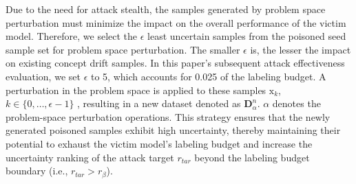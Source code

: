 \begin{table}[h!]
	\caption{Problem-Space Perturbation Operations}
	\label{tab: List of Problem Space Perturbation Operations}
	\setlength{\tabcolsep}{5.8pt}
	\begin{center}
	\end{center}
\end{table}

Due to the need for attack stealth, the samples generated by problem space perturbation must minimize the impact on the overall performance of the victim model. 
Therefore, we select the $\epsilon$ least uncertain samples from the poisoned seed sample set for problem space perturbation. 
The smaller $\epsilon$ is, the lesser the impact on existing concept drift samples.
In this paper's subsequent attack effectiveness evaluation, we set $\epsilon$ to 5, which accounts for 0.025 of the labeling budget.
A perturbation in the problem space is applied to these samples $\bm{\mathrm{x}}_{k}$, $k \in \{0, \dots,  \epsilon-1 \}$ , resulting in a new dataset denoted as $\bm{D}_{\alpha}^{n}$.
$\alpha$ denotes the problem-space perturbation operations.
This strategy ensures that the newly generated poisoned samples exhibit high uncertainty, thereby maintaining their potential to exhaust the victim model’s labeling budget and increase the uncertainty ranking of the attack target $r_{tar}$ beyond the labeling budget boundary (i.e., $r_{tar} > r_{\beta}$).

